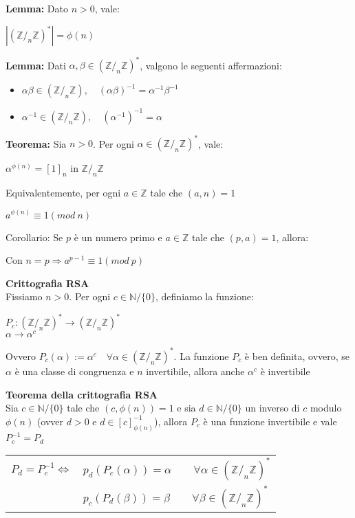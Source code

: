 \documentclass[12pt, a4paper]{article}
\begin{document}
\textbf{Lemma:} Dato $n>0$, vale:
\begin{center}
    $|(\mathbb{Z}/_{n}\mathbb{Z})^{*}|=\phi(n)$
\end{center}

\textbf{Lemma:} Dati $\alpha,\beta\in(\mathbb{Z}/_{n}\mathbb{Z})^{*}$, valgono le seguenti affermazioni:
\begin{itemize}
    \item $\alpha\beta\in(\mathbb{Z}/_{n}\mathbb{Z}),\quad (\alpha\beta)^{-1}=\alpha^{-1}\beta^{-1}$
    \item $\alpha^{-1}\in(\mathbb{Z}/_{n}\mathbb{Z}),\quad (\alpha^{-1})^{-1}=\alpha$
\end{itemize}

\textbf{Teorema:} Sia $n>0$. Per ogni $\alpha\in(\mathbb{Z}/_{n}\mathbb{Z})^{*}$, vale:
\begin{center}
    $\alpha^{\phi(n)}=[1]_{n}$ in $\mathbb{Z}/_{n}\mathbb{Z}$
\end{center}
Equivalentemente, per ogni $a\in\mathbb{Z}$ tale che $(a,n)=1$
\begin{center}
    $a^{\phi(n)}\equiv 1(mod\ n)$
\end{center}

Corollario: Se $p$ è un numero primo e $a\in\mathbb{Z}$ tale che $(p,a)=1$, allora:
\begin{center}
    Con $n=p\Rightarrow a^{p-1}\equiv 1(mod\ p)$
\end{center}

\newpage
{}


\textbf{Crittografia RSA}\\
Fissiamo  $n>0$. Per ogni $c\in\mathbb{N}/\{0\}$, definiamo la funzione:
\begin{center}
    $P_{c}:(\mathbb{Z}/_{n}\mathbb{Z})^{*}\rightarrow(\mathbb{Z}/_{n}\mathbb{Z})^{*}$\\
    $\alpha\rightarrow\alpha^{c}$
\end{center}
Ovvero $P_{c}(\alpha):= \alpha^{c}\quad\forall\alpha\in(\mathbb{Z}/_{n}\mathbb{Z})^{*}$. La funzione $P_{c}$ è
ben definita, ovvero, se $\alpha$ è una classe di congruenza e $n$ invertibile, allora anche $\alpha^{c}$ è 
invertibile

\textbf{Teorema della crittografia RSA}\\ Sia $c\in\mathbb{N}/\{0\}$ tale che $(c,\phi(n))=1$ e sia $d\in\mathbb{N}
/\{0\}$ un inverso di $c$ modulo $\phi(n)$ (ovver $d>0$ e $d\in[c]^{-1}_{\phi(n)}$), allora $P_{c}$ è una funzione
invertibile e vale $P_{c}^{-1}=P_{d}$
\begin{center}
    \begin{tabular}{c l}
        $P_{d}=P_{c}^{-1}\Leftrightarrow$ & $p_{d}(P_{c}(\alpha))=\alpha\qquad\forall\alpha\in(\mathbb{Z}/_{n}
        \mathbb{Z})^{*}$\\
        & $p_{c}(P_{d}(\beta))=\beta\qquad\forall\beta\in(\mathbb{Z}/_{n}\mathbb{Z})^{*}$\\
    \end{tabular}
\end{center}
\end{document}
